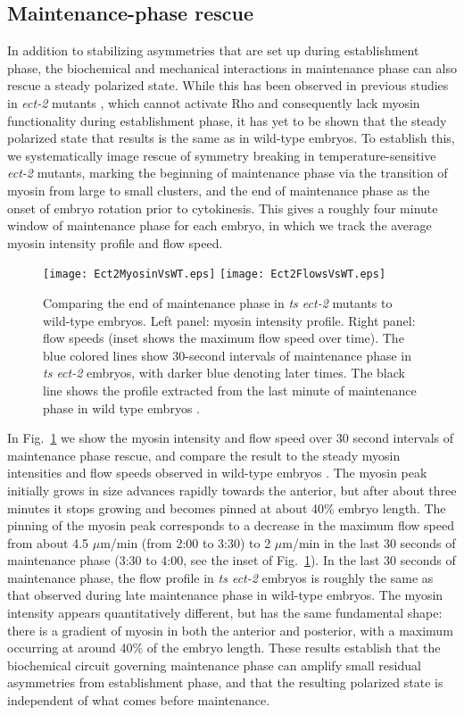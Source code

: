 \documentclass[11pt]{article}
\newcommand{\6}[1]{#1_{\text{6}}}
\newcommand{\3}[1]{#1_{\text{3}}}
\begin{document}
\subsection{Maintenance-phase rescue}
In addition to stabilizing asymmetries that are set up during establishment phase, the biochemical and mechanical interactions in maintenance phase can also rescue a steady polarized state. While this has been observed in previous studies  in \emph{ect-2} mutants \cite{zonies2010symmetry, tse2012rhoa}, which cannot activate Rho and consequently lack myosin functionality during establishment phase, it has yet to be shown that the steady polarized state that results is the same as in wild-type embryos. To establish this, we systematically image rescue of symmetry breaking in temperature-sensitive \emph{ect-2} mutants, marking the beginning of maintenance phase via the transition of myosin from large to small clusters, and the end of maintenance phase as the onset of embryo rotation prior to cytokinesis. This gives a roughly four minute window of maintenance phase for each embryo, in which we track the average myosin intensity profile and flow speed.

\begin{figure}
\centering
\texttt{[image: Ect2MyosinVsWT.eps]}
\texttt{[image: Ect2FlowsVsWT.eps]}
\caption{\label{fig:Ect2VsWT} Comparing the end of maintenance phase in \emph{ts ect-2} mutants to wild-type embryos. Left panel: myosin intensity profile. Right panel: flow speeds (inset shows the maximum flow speed over time). The blue colored lines show 30-second intervals of maintenance phase in \emph{ts ect-2} embryos, with darker blue denoting later times. The black line shows the profile extracted from the last minute of maintenance phase in wild type embryos \cite{sailer2015dynamic}.}
\end{figure}

In Fig.\ \ref{fig:Ect2VsWT} we show the myosin intensity and flow speed over 30 second intervals of maintenance phase rescue, and compare the result to the steady myosin intensities and flow speeds observed in wild-type embryos \cite{sailer2015dynamic}. The myosin peak initially grows in size advances rapidly towards the anterior, but after about three minutes it stops growing and becomes pinned at about 40\% embryo length. The pinning of the myosin peak corresponds to a decrease in the maximum flow speed from about 4.5 $\mu$m/min (from 2:00 to 3:30) to 2 $\mu$m/min in the last 30 seconds of maintenance phase (3:30 to 4:00, see the inset of Fig.\ \ref{fig:Ect2VsWT}). In the last 30 seconds of maintenance phase, the flow profile in \emph{ts ect-2} embryos is roughly the same as that observed during late maintenance phase in wild-type embryos. The myosin intensity appears quantitatively different, but has the same fundamental shape: there is a gradient of myosin in both the anterior and posterior, with a maximum occurring at around 40\% of the embryo length. These results establish that the biochemical circuit governing maintenance phase can amplify small residual asymmetries from establishment phase, and that the resulting polarized state is independent of what comes before maintenance. 
\end{document}
